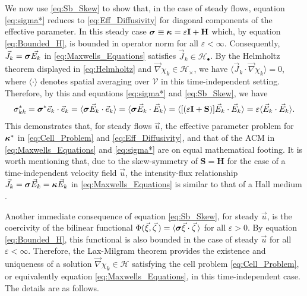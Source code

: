 \documentclass[11pt]{amsart}
\newcommand{\Hb}{\mathbf{H}}
\newcommand{\Ib}{\mathbf{I}}
\newcommand{\Sb}{\mathbf{S}}
\newcommand{\Vc}{\mathcal{V}}
\newcommand{\Hs}{\mathscr{H}}
\newcommand\bsig{\mbox{\boldmath${\sigma}$}}
\newcommand\bkappa{\mbox{\boldmath${\kappa}$}}
\begin{document}
We now use \eqref{eq:Sb_Skew} to show that, in the case of steady
flows, equation \eqref{eq:sigma*} reduces to
\eqref{eq:Eff_Diffusivity} for diagonal components of the effective
parameter. In this steady case $\bsig\equiv\bkappa=\varepsilon\Ib+\Hb$ which, by
equation \eqref{eq:Bounded_H}, is bounded in operator norm for all
$\varepsilon<\infty$. Consequently, $\vec{J}_k=\bsig\vec{E_k}$ in 
\eqref{eq:Maxwells_Equations} satisfies $\vec{J}_k\in\mathscr{H}_\bullet$. By
the Helmholtz theorem displayed in \eqref{eq:Helmholtz} and
$\vec{\nabla}\chi_k\in\mathscr{H}_\times$, we have $\langle\vec{J}_k\cdot\vec{\nabla}\chi_k\rangle=0$, where 
$\langle\cdot\rangle$ denotes spatial averaging over $\Vc$ in this time-independent
setting. Therefore, by this and equations \eqref{eq:sigma*} and 
\eqref{eq:Sb_Skew}, we have
\cite{Fannjiang:SIAM_JAM:333} 
%
\begin{align}\label{eq:Reduction}
  \sigma^*_{kk}=\bsig^*\vec{e}_k\cdot\vec{e}_k 
       =\langle\bsig\vec{E}_k\cdot\vec{e}_k\rangle
       =\langle\bsig\vec{E}_k\cdot\vec{E}_k\rangle
       =\langle[(\varepsilon\Ib+\Sb)]\vec{E}_k\cdot\vec{E}_k\rangle
       =\varepsilon\langle\vec{E}_k\cdot\vec{E}_k\rangle.
\end{align}
%
This demonstrates that, for steady flows $\vec{u}$, the effective
parameter problem for $\bkappa^*$ in \eqref{eq:Cell_Problem} and
\eqref{eq:Eff_Diffusivity}, and that of the ACM \cite{Golden:CMP-473}
in \eqref{eq:Maxwells_Equations} and \eqref{eq:sigma*}  are on equal
mathematical footing. It is worth  
mentioning that, due to the skew-symmetry of $\Sb=\Hb$ for the case of
a time-independent velocity field $\vec{u}$, the intensity-flux
relationship $\vec{J}_k=\bsig\vec{E}_k=\bkappa\vec{E}_k$ in
\eqref{eq:Maxwells_Equations} is similar to that of a Hall medium
\cite{Isichenko:JNS:1991:375}.    




Another immediate consequence of equation \eqref{eq:Sb_Skew}, for
steady $\vec{u}$, is the coercivity of the bilinear functional
$\Phi(\vec{\xi},\vec{\zeta}\,)=\langle\bsig\vec{\xi}\cdot\vec{\zeta}\,\rangle$ for all $\varepsilon>0$. By equation
\eqref{eq:Bounded_H}, this functional is also bounded in the case of
steady $\vec{u}$ for all $\varepsilon<\infty$. Therefore, the Lax-Milgram theorem
\cite{McOwen:2003:PDE} provides the existence and uniqueness of a
solution $\vec{\nabla}\chi_k\in\Hs$ satisfying the cell problem
\eqref{eq:Cell_Problem}, or equivalently equation
\eqref{eq:Maxwells_Equations}, in this time-independent case. The
details are as follows. 
\end{document}
